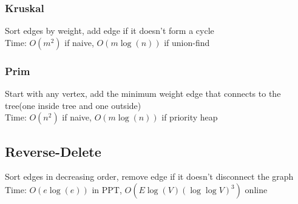 \documentclass{article}
\begin{document}
\begin{multicols*}{2}
        \subsubsection*{Kruskal}
        Sort edges by weight, add edge if it doesn't form a cycle\\
        Time: $O(m^2)$ if naive, $O(m\log(n))$ if union-find
        \subsubsection*{Prim}
        Start with any vertex, add the minimum weight edge that connects to the tree(one inside
        tree and one outside)\\
        Time: $O(n^2)$ if naive, $O(m\log(n))$ if priority heap
        \subsection*{Reverse-Delete}
        Sort edges in decreasing order, remove edge if it doesn't disconnect the graph\\
        Time: $O(e\log(e))$ in PPT, $O(E\log(V)(\log\log V)^3)$ online
    \end{multicols*}
\end{document}
